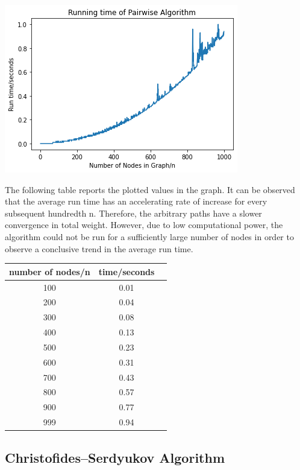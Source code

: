 \documentclass[12pt]{report}
\begin{document}
\begin{center}
    \includegraphics[scale = 0.75]{2_opt.png}
\end{center}

The following table reports the plotted values in the graph. It can be observed that the average run time has an accelerating rate of increase for every subsequent hundredth n. Therefore, the arbitrary paths have a slower convergence in total weight. However, due to low computational power, the algorithm could not be run for a sufficiently large number of nodes in order to observe a conclusive trend in the average run time.

\begin{center}
\begin{tabular}{ |c|c|c| } 
 \hline
 number of nodes/n & time/seconds \\ 
 \hline
 100 & 0.01  \\ 
 \hline
 200 & 0.04 \\ 
 \hline
 300 & 0.08 \\ 
 \hline
 400 & 0.13  \\ 
 \hline
 500 & 0.23 \\ 
 \hline
 600 & 0.31 \\ 
 \hline
 700 & 0.43  \\ 
 \hline
 800 & 0.57 \\ 
 \hline
 900 & 0.77 \\ 
 \hline
 999 & 0.94  \\ 
 \hline
\end{tabular}
\end{center}
     
\subsection {Christofides–Serdyukov Algorithm}
\end{document}
